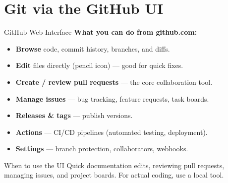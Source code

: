 \documentclass[aspectratio=169, 11pt]{beamer}
\begin{document}
\section{Git via the GitHub UI}

\begin{frame}{GitHub Web Interface}
  \textbf{What you can do from github.com:}
  \begin{itemize}
    \item \textbf{Browse} code, commit history, branches, and diffs.
    \item \textbf{Edit} files directly (pencil icon) --- good for quick fixes.
    \item \textbf{Create / review pull requests} --- the core collaboration tool.
    \item \textbf{Manage issues} --- bug tracking, feature requests, task boards.
    \item \textbf{Releases \& tags} --- publish versions.
    \item \textbf{Actions} --- CI/CD pipelines (automated testing, deployment).
    \item \textbf{Settings} --- branch protection, collaborators, webhooks.
  \end{itemize}

  \vspace{0.5em}
  \begin{block}{When to use the UI}
    Quick documentation edits, reviewing pull requests, managing issues, and project boards. For actual coding, use a local tool.
  \end{block}
\end{frame}
\end{document}
